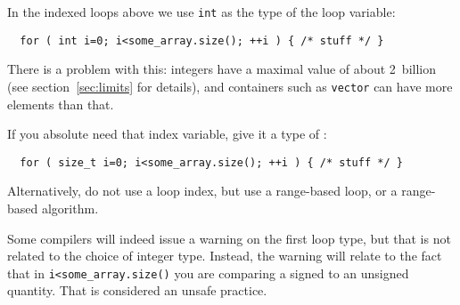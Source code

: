 
In the indexed loops above we use \lstinline{int} as the type of the loop variable:
\begin{lstlisting}
  for ( int i=0; i<some_array.size(); ++i ) { /* stuff */ }
\end{lstlisting}
There is a problem with this: integers have a maximal value of
about 2~billion (see section~\ref{sec:limits} for details),
and containers such as \lstinline{vector} can have more elements than that.

If you absolute need that index variable,
give it a type of :
\begin{lstlisting}
  for ( size_t i=0; i<some_array.size(); ++i ) { /* stuff */ }
\end{lstlisting}

Alternatively, do not use a loop index, but use a range-based loop,
or a range-based algorithm.

\begin{remark}
  Some compilers will indeed issue a warning on the first loop type,
  but that is not related to the choice of integer type.
  Instead, the warning will relate to the fact that in
  \lstinline|i<some_array.size()|
  you are comparing a signed to an unsigned quantity.
  That is considered an unsafe practice.
\end{remark}
